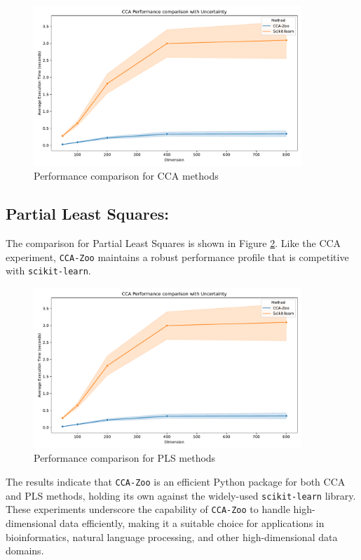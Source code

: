 \begin{figure}[h]
    \centering
    \includegraphics[width=0.9\textwidth]{figures/CCA_Speed_Benchmark}
    \caption{Performance comparison for CCA methods}
    \label{fig:cca_benchmark}
\end{figure}

\subsection{Partial Least Squares:}
The comparison for Partial Least Squares is shown in Figure \ref{fig:pls_benchmark}.
Like the CCA experiment, \texttt{CCA-Zoo} maintains a robust performance profile that is competitive with \texttt{scikit-learn}.

\begin{figure}[h]
    \centering
    \includegraphics[width=0.9\textwidth]{figures/CCA_Speed_Benchmark}
    \caption{Performance comparison for PLS methods}
    \label{fig:pls_benchmark}
\end{figure}

The results indicate that \texttt{CCA-Zoo} is an efficient Python package for both CCA and PLS methods, holding its own against the widely-used \texttt{scikit-learn} library.
These experiments underscore the capability of \texttt{CCA-Zoo} to handle high-dimensional data efficiently, making it a suitable choice for applications in bioinformatics, natural language processing, and other high-dimensional data domains.

